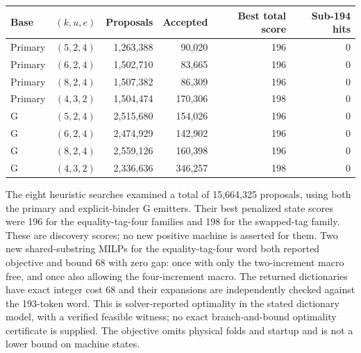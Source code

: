 \begin{center}\small
\begin{tabular}{lcrrrr}
\toprule Base & $(k,u,e)$ & Proposals & Accepted & Best total score & Sub-194 hits\\\midrule
Primary & $(5,2,4)$ & 1,263,388 & 90,020 & 196 & 0 \\
Primary & $(6,2,4)$ & 1,502,710 & 83,665 & 196 & 0 \\
Primary & $(8,2,4)$ & 1,507,382 & 86,309 & 196 & 0 \\
Primary & $(4,3,2)$ & 1,504,474 & 170,306 & 198 & 0 \\
G & $(5,2,4)$ & 2,515,680 & 154,026 & 196 & 0 \\
G & $(6,2,4)$ & 2,474,929 & 142,902 & 196 & 0 \\
G & $(8,2,4)$ & 2,559,126 & 160,398 & 196 & 0 \\
G & $(4,3,2)$ & 2,336,636 & 346,257 & 198 & 0 \\
\bottomrule\end{tabular}\end{center}
The eight heuristic searches examined a total of 15,664,325 proposals, using both the primary and explicit-binder G emitters. Their best penalized state scores were 196 for the equality-tag-four families and 198 for the swapped-tag family. These are discovery scores; no new positive machine is asserted for them.
Two new shared-substring MILPs for the equality-tag-four word both reported objective and bound 68 with zero gap: once with only the two-increment macro free, and once also allowing the four-increment macro. The returned dictionaries have exact integer cost 68 and their expansions are independently checked against the 193-token word. This is solver-reported optimality in the stated dictionary model, with a verified feasible witness; no exact branch-and-bound optimality certificate is supplied. The objective omits physical folds and startup and is not a lower bound on machine states.
